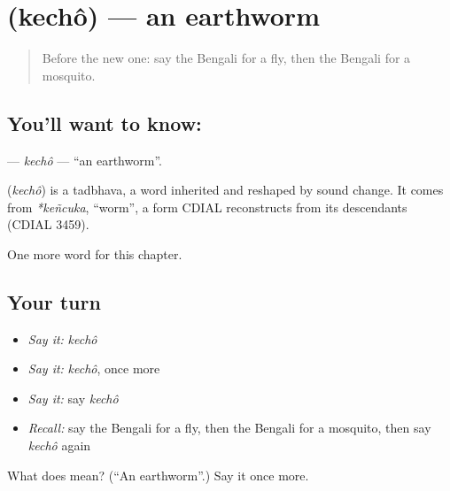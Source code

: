 \section[\texorpdfstring{\bn{কেঁচো} (kechô)}{কেঁচো (kechô)}]{ (kechô) — an earthworm}

\label{lesson:BN-C122-kecho}



\begin{quote}
Before the new one: say the Bengali for a fly, then the Bengali for a mosquito.
\end{quote}

\subsection*{You'll want to know: }
\textbf{} — \emph{kechô} — \textquotedblleft{}an earthworm\textquotedblright{}.

\begin{cousinweb}
\textbf{} (\emph{kechô}) is a tadbhava, a word inherited and reshaped by sound change. It comes from \emph{*keñcuka}, \textquotedblleft{}worm\textquotedblright{}, a form CDIAL reconstructs from its descendants (CDIAL 3459).
\end{cousinweb}

\begin{grammarlens}[title={What you've built}]
One more word for this chapter.
\end{grammarlens}

\subsection*{Your turn}
\begin{itemize}
\raggedright
  \item \emph{Say it:} \emph{kechô}
  \item \emph{Say it:} \emph{kechô}, once more
  \item \emph{Say it:} say \emph{kechô}
  \item \emph{Recall:} say the Bengali for a fly, then the Bengali for a mosquito, then say \emph{kechô} again
\end{itemize}

\begin{tcolorbox}[breakable,colback=teal!4,colframe=teal!35!black,title={Before you move on}]
What does  mean? (\textquotedblleft{}An earthworm\textquotedblright{}.) Say it once more.
\end{tcolorbox}
